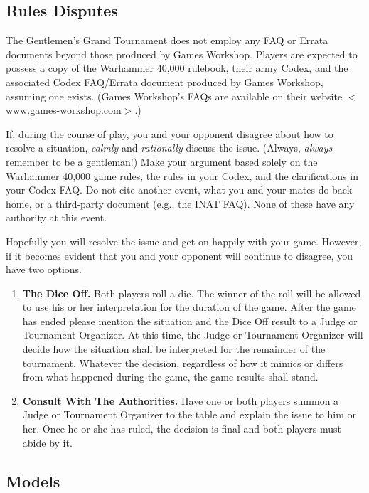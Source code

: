 \documentclass[10pt,titlepage]{article}
\begin{document}
\subsection*{Rules Disputes}

The Gentlemen's Grand Tournament does not employ any FAQ or Errata documents beyond those produced by Games Workshop. Players are expected to possess a copy of the Warhammer 40,000 rulebook, their army Codex, and the associated Codex FAQ/Errata document produced by Games Workshop, assuming one exists. (Games Workshop's FAQs are available on their website $<$www.games-workshop.com$>$.)

If, during the course of play, you and your opponent disagree about how to resolve a situation, \textit{calmly} and \textit{rationally} discuss the issue. (Always, \textit{always} remember to be a gentleman!) Make your argument based solely on the Warhammer 40,000 game rules, the rules in your Codex, and the clarifications in your Codex FAQ. Do not cite another event, what you and your mates do back home, or a third-party document (e.g., the INAT FAQ). None of these have any authority at this event.

Hopefully you will resolve the issue and get on happily with your game. However, if it becomes evident that you and your opponent will continue to disagree, you have two options.

\begin{enumerate}
\item \textbf{The Dice Off.} Both players roll a die. The winner of the roll will be allowed to use his or her interpretation for the duration of the game. After the game has ended please mention the situation and the Dice Off result to a Judge or Tournament Organizer. At this time, the Judge or Tournament Organizer will decide how the situation shall be interpreted for the remainder of the tournament. Whatever the decision, regardless of how it mimics or differs from what happened during the game, the game results shall stand.

\item \textbf{Consult With The Authorities.} Have one or both players summon a Judge or Tournament Organizer to the table and explain the issue to him or her. Once he or she has ruled, the decision is final and both players must abide by it.
\end{enumerate}

\subsection*{Models}
\end{document}
